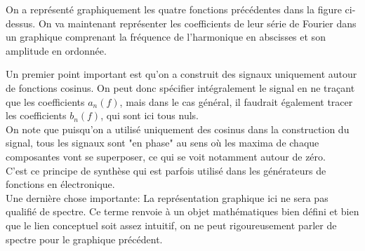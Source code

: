 \documentclass[11pt,a4paper]{article}
\begin{document}
On a représenté graphiquement les quatre fonctions précédentes dans la figure ci-dessus. On va maintenant représenter les coefficients de leur série de Fourier dans un graphique comprenant la fréquence de l'harmonique en abscisses et son amplitude en ordonnée.\\

\begin{center}
\end{center}

Un premier point important est qu'on a construit des signaux uniquement autour de fonctions cosinus. On peut donc spécifier intégralement le signal en ne traçant que les coefficients $a_n(f)$, mais dans le cas général, il faudrait également tracer les coefficients $b_n(f)$, qui sont ici tous nuls.\\

On note que puisqu'on a utilisé uniquement des cosinus dans la construction du signal, tous les signaux sont "en phase" au sens où les maxima de chaque composantes vont se superposer, ce qui se voit notamment autour de zéro.\\

C'est ce principe de synthèse qui est parfois utilisé dans les générateurs de fonctions en électronique.\\

Une dernière chose importante: La représentation graphique ici ne sera pas qualifié de spectre. Ce terme renvoie à un objet mathématiques bien défini et bien que le lien conceptuel soit assez intuitif, on ne peut rigoureusement parler de spectre pour le graphique précédent.\\
\end{document}

